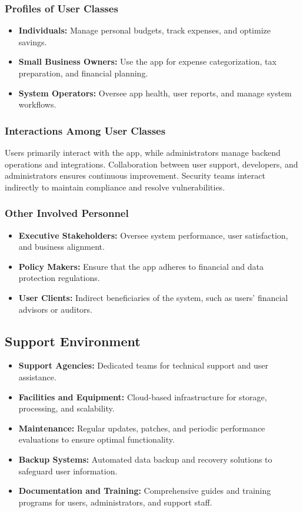 \subsubsection{Profiles of User Classes}
\begin{itemize}
    \item \textbf{Individuals:} Manage personal budgets, track expenses, and optimize savings.
    \item \textbf{Small Business Owners:} Use the app for expense categorization, tax preparation, and financial planning.
    \item \textbf{System Operators:} Oversee app health, user reports, and manage system workflows.
\end{itemize}

\subsubsection{Interactions Among User Classes}
Users primarily interact with the app, while administrators manage backend operations and integrations. Collaboration between user support, developers, and administrators ensures continuous improvement. Security teams interact indirectly to maintain compliance and resolve vulnerabilities.

\subsubsection{Other Involved Personnel}
\begin{itemize}
    \item \textbf{Executive Stakeholders:} Oversee system performance, user satisfaction, and business alignment.
    \item \textbf{Policy Makers:} Ensure that the app adheres to financial and data protection regulations.
    \item \textbf{User Clients:} Indirect beneficiaries of the system, such as users’ financial advisors or auditors.
\end{itemize}

\subsection{Support Environment}
\begin{itemize}
    \item \textbf{Support Agencies:} Dedicated teams for technical support and user assistance.
    \item \textbf{Facilities and Equipment:} Cloud-based infrastructure for storage, processing, and scalability.
    \item \textbf{Maintenance:} Regular updates, patches, and periodic performance evaluations to ensure optimal functionality.
    \item \textbf{Backup Systems:} Automated data backup and recovery solutions to safeguard user information.
    \item \textbf{Documentation and Training:} Comprehensive guides and training programs for users, administrators, and support staff.
\end{itemize}

